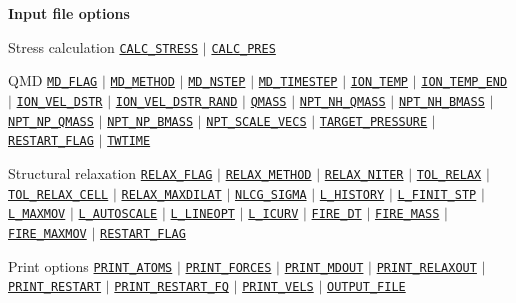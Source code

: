 \begin{frame}[allowframebreaks]{\textbf{Input file options}}
\vspace{-2mm}
\begin{block}{Stress calculation}
\hyperlink{CALC_STRESS}{\texttt{CALC\_STRESS}} $\vert$
\hyperlink{CALC_PRES}{\texttt{CALC\_PRES}}
\end{block}
\vspace{-2mm}

\begin{block}{QMD}
\hyperlink{MD_FLAG}{\texttt{MD\_FLAG}} $\vert$
\hyperlink{MD_METHOD}{\texttt{MD\_METHOD}} $\vert$
\hyperlink{MD_NSTEP}{\texttt{MD\_NSTEP}} $\vert$
\hyperlink{MD_TIMESTEP}{\texttt{MD\_TIMESTEP}} $\vert$
\hyperlink{ION_TEMP}{\texttt{ION\_TEMP}} $\vert$
\hyperlink{ION_TEMP_END}{\texttt{ION\_TEMP\_END}} $\vert$
\hyperlink{ION_VEL_DSTR}{\texttt{ION\_VEL\_DSTR}} $\vert$
\hyperlink{ION_VEL_DSTR_RAND}{\texttt{ION\_VEL\_DSTR\_RAND}} $\vert$
\hyperlink{QMASS}{\texttt{QMASS}} $\vert$
\hyperlink{NPT_NH_QMASS}{\texttt{NPT\_NH\_QMASS}} $\vert$
\hyperlink{NPT_NH_BMASS}{\texttt{NPT\_NH\_BMASS}} $\vert$
\hyperlink{NPT_NP_QMASS}{\texttt{NPT\_NP\_QMASS}} $\vert$
\hyperlink{NPT_NP_BMASS}{\texttt{NPT\_NP\_BMASS}} $\vert$
\hyperlink{NPT_SCALE_VECS}{\texttt{NPT\_SCALE\_VECS}} $\vert$
\hyperlink{TARGET_PRESSURE}{\texttt{TARGET\_PRESSURE}} $\vert$
\hyperlink{RESTART_FLAG}{\texttt{RESTART\_FLAG}} $\vert$
\hyperlink{TWTIME}{\texttt{TWTIME}}
\end{block}

\vspace{-2mm}
\begin{block}{Structural relaxation}
\hyperlink{RELAX_FLAG}{\texttt{RELAX\_FLAG}} $\vert$
\hyperlink{RELAX_METHOD}{\texttt{RELAX\_METHOD}} $\vert$
\hyperlink{RELAX_NITER}{\texttt{RELAX\_NITER}} $\vert$
\hyperlink{TOL_RELAX}{\texttt{TOL\_RELAX}} $\vert$
\hyperlink{TOL_RELAX_CELL}{\texttt{TOL\_RELAX\_CELL}} $\vert$
\hyperlink{RELAX_MAXDILAT}{\texttt{RELAX\_MAXDILAT}} $\vert$
\hyperlink{NLCG_SIGMA}{\texttt{NLCG\_SIGMA}} $\vert$
\hyperlink{L_HISTORY}{\texttt{L\_HISTORY}} $\vert$
\hyperlink{L_FINIT_STP}{\texttt{L\_FINIT\_STP}} $\vert$
\hyperlink{L_MAXMOV}{\texttt{L\_MAXMOV}} $\vert$
\hyperlink{L_AUTOSCALE}{\texttt{L\_AUTOSCALE}} $\vert$
\hyperlink{L_LINEOPT}{\texttt{L\_LINEOPT}} $\vert$
\hyperlink{L_ICURV}{\texttt{L\_ICURV}} $\vert$
\hyperlink{FIRE_DT}{\texttt{FIRE\_DT}} $\vert$
\hyperlink{FIRE_MASS}{\texttt{FIRE\_MASS}} $\vert$
\hyperlink{FIRE_MAXMOV}{\texttt{FIRE\_MAXMOV}} $\vert$
\hyperlink{RESTART_FLAG}{\texttt{RESTART\_FLAG}}
\end{block}

\begin{block}{Print options}
\hyperlink{PRINT_ATOMS}{\texttt{PRINT\_ATOMS}} $\vert$
\hyperlink{PRINT_FORCES}{\texttt{PRINT\_FORCES}} $\vert$
\hyperlink{PRINT_MDOUT}{\texttt{PRINT\_MDOUT}} $\vert$
\hyperlink{PRINT_RELAXOUT}{\texttt{PRINT\_RELAXOUT}} $\vert$
\hyperlink{PRINT_RESTART}{\texttt{PRINT\_RESTART}} $\vert$
\hyperlink{PRINT_RESTART_FQ}{\texttt{PRINT\_RESTART\_FQ}} $\vert$
\hyperlink{PRINT_VELS}{\texttt{PRINT\_VELS}} $\vert$
\hyperlink{OUTPUT_FILE}{\texttt{OUTPUT\_FILE}}
\end{block}


\end{frame}
